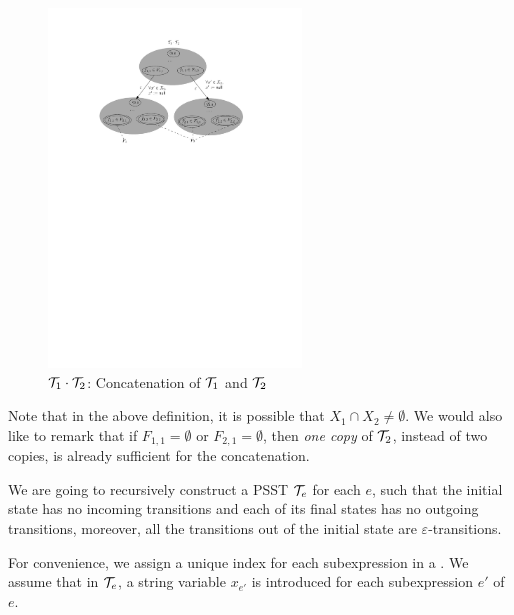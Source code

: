 \begin{definition}
\begin{figure}[ht]
			\centering
			\includegraphics[width = 0.6\textwidth]{psstconcat.pdf}
			\caption{$\mathcal{T}_1\cdot \mathcal{T}_2$: Concatenation of $\mathcal{T}_1$ and $\mathcal{T}_2$}
			\label{fig-psstconcat}
		\end{figure}  
\end{definition}
Note that in the above definition, it is possible that $X_1 \cap X_2 \neq \emptyset$. We would also like to remark that if $F_{1,1} = \emptyset$ or $F_{2,1} = \emptyset$, then \emph{one copy} of $\mathcal{T}_2$, instead of two copies, is already sufficient for the concatenation.

We are going to recursively construct a PSST $\mathcal{T}_e$ for each {\pcre} $e$, such that 
     the initial state has no incoming transitions and each of its final states has no outgoing transitions,
    moreover, all the transitions out of the initial state are $\varepsilon$-transitions. 

For convenience, we assign a unique index for each subexpression in a {\pcre}. 
We assume that in $\mathcal{T}_e$, a string variable $x_{e'}$ is introduced for each subexpression $e'$ of $e$. 

